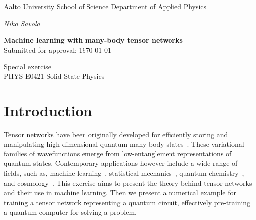 

\lfoot{}
\cfoot{}
\rfoot{\thepage}


\usepackage[braket, qm]{qcircuit}  %




\begin{titlepage}
    {\sffamily
    \noindent
    \fontsize{12}{14}\selectfont
    Aalto University \newline
    School of Science \newline
    Department of Applied Physics

    \vspace{40mm}

    \noindent
    \fontsize{14}{16}\selectfont
    \emph{Niko Savola}

    \vspace{10mm}

    \noindent
    \fontsize{18}{22}\selectfont
    \textbf{Machine learning with many-body tensor networks}\\

    \fontsize{12}{14}\selectfont
    \noindent
    Submitted for approval: \today

    \vspace{70mm}

    \noindent
    Special exercise \\[4mm]
    PHYS-E0421 \textendash{} Solid-State Physics \\[4mm]
    } %

\end{titlepage}
\newpage


\section{Introduction}

Tensor networks have been originally developed for efficiently storing and manipulating high-dimensional quantum many-body states~\cite{PhysRevLett.69.2863}. These variational families of wavefunctions emerge from low-entanglement representations of quantum states. Contemporary applications however include a wide range of fields, such as, machine learning~\cite{Roberts2019}, statistical mechanics~\cite{Levin_2007}, quantum chemistry~\cite{White1999}, and cosmology~\cite{Bao_2017}.
This exercise aims to present the theory behind tensor networks and their use in machine learning. Then we present a numerical example for training a tensor network representing a quantum circuit, effectively pre-training a quantum computer for solving a problem.

